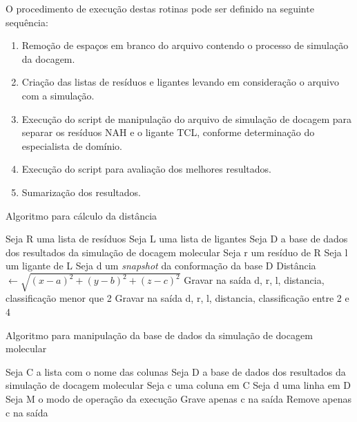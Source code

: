 O procedimento de execução destas rotinas pode ser definido na seguinte sequência:

\begin{enumerate}
    \item Remoção de espaços em branco do arquivo contendo o processo de simulação da docagem. 
    \item Criação das listas de resíduos e ligantes levando em consideração o arquivo com a simulação.
    \item Execução do script de manipulação do arquivo de simulação de docagem para separar os resíduos NAH e o ligante TCL, conforme determinação do especialista de domínio.
    \item Execução do script para avaliação dos melhores resultados.
    \item Sumarização dos resultados.
\end{enumerate}


\begin{algorithm}[H]
\caption{Algoritmo para cálculo da distância}
\label{CalculoDistancia}
\begin{algorithmic}[1]
	\STATE Seja R uma lista de resíduos
	\STATE Seja L uma lista de ligantes
	\STATE Seja D a base de dados dos resultados da simulação de docagem molecular
	\STATE Seja r um resíduo de R
	\STATE Seja l um ligante de L
	\STATE Seja d um \emph{snapshot} da conformação da base D
			\STATE Distância $\gets \sqrt{(x - a)^{2} +(y - b)^{2} + (z - c)^{2}}$ 
			\ENDIF
				\STATE Gravar na saída d, r, l, distancia, classificação menor que 2
				\ELSE
				\STATE Gravar na saída d, r, l, distancia, classificação entre 2 e 4
				\ENDIF
			\ENDIF
			\ENDFOR
		\ENDFOR
	\ENDFOR
\end{algorithmic}
\end{algorithm}

\begin{algorithm}[H]
\caption{Algoritmo para manipulação da base de dados da simulação de docagem molecular}
\label{ajustaColunaDocking}
\begin{algorithmic}[1]
	\STATE Seja C a lista com o nome das colunas
	\STATE Seja D a base de dados dos resultados da simulação de docagem molecular
	\STATE Seja c uma coluna em C
	\STATE Seja d uma linha em D
	\STATE Seja M o modo de operação da execução
			\STATE Grave apenas c na saída
			\ENDFOR
		\ENDFOR
	\ENDIF
			\STATE Remove apenas c na saída
			\ENDFOR
		\ENDFOR
	\ENDIF
\end{algorithmic}
\end{algorithm}

